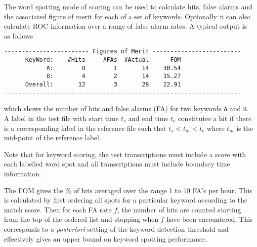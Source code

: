 The word spotting mode of scoring can be used to calculate hits,
false alarms and the associated figure of merit for each of a
set of keywords.
Optionally it can also calculate ROC information over a range of
false alarm rates.  A typical output is as follows
\begin{verbatim}
------------------------ Figures of Merit -------------------------
      KeyWord:    #Hits     #FAs  #Actual      FOM
            A:        8        1       14    30.54
            B:        4        2       14    15.27
      Overall:       12        3       28    22.91
-------------------------------------------------------------------
\end{verbatim}
which shows the number of hits and false alarms (FA) for two keywords
\texttt{A} and \texttt{B}.  A label in the test file with start time $t_s$
and end time $t_e$ constitutes a hit if there is a corresponding label
in the reference file such that $t_s < t_m < t_e$ where $t_m$ is the
mid-point of the reference label.

Note that for keyword scoring, the test
transcriptions must include a score with each labelled word spot
and all transcriptions must include boundary time information.

The FOM gives the \% of hits
averaged over the range 1 to 10 FA's per hour.  This is calculated
by first ordering all spots for a particular keyword according to
the match score.  Then for each FA rate $f$, the number of hits are counted
starting from the top of the ordered list and stopping when 
$f$ have been encountered.  This corresponds to \textit{a posteriori}
setting of the keyword detection threshold and effectively gives an
upper bound on keyword spotting performance.


